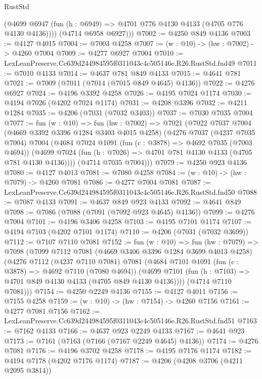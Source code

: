 \begin{lexlean}{RustStd}
\begin{coremodule}
          (@4699 @6947 (fun (h : @6949) => @4701 @776 @4130 @4133 (@4705 @776 @4130 @4136))))
        (@4714 @6958 @6927)))
@7002 := @4250 @849 @4136
@7003 := @4127 @4015
@7004 := @7003 @4258
@7007 := (w : @10) -> (hw : @7002) -> @4260 @7004
@7009 := @4277 @6927 @7004
@7010 := LexLeanPreserve.Cc639d244984595f0311043c4c505146e.R26.RustStd.fnd49
@7011 := @7010 @4133
@7014 := @4637 @781 @849 @4133
@7015 := @4641 @781
@7021 := @7009 (@7011 (@7014 (@7015 @849 @4645) @4136))
@7022 := @4276 @6927
@7024 := @4196 @3392 @4258
@7026 := @4195 @7024 @1174
@7030 := @4194 @7026 (@4202 @7024 @1174)
@7031 := @4208 @3396
@7032 := @4211 @1284
@7035 := @4206 (@7031 (@7032 @3403))
@7037 := @7030 @7035 @7004
@7077 := fun (w : @10) =>
  fun (hw : @7002) =>
  @7021
    (@7022
      @7037
      @7004
      (@4669 @3392 @3396 @1284 @3403 @4015 @4258)
      (@4276
        @7037
        (@4237 @7035 @7004)
        @7004
        (@4684
          @7024
          @1091
          (fun (c : @3878) => @4692 @7035 (@7003 @4694))
          (@4699 @7024 (fun (h : @7026) => @4701 @781 @4130 @4133 (@4705 @781 @4130 @4136))))
        (@4714 @7035 @7004)))
@7079 := @4250 @923 @4136
@7080 := @4127 @4013
@7081 := @7080 @4258
@7084 := (w : @10) -> (hw : @7079) -> @4260 @7081
@7086 := @4277 @7004 @7081
@7087 := LexLeanPreserve.Cc639d244984595f0311043c4c505146e.R26.RustStd.fnd50
@7088 := @7087 @4133
@7091 := @4637 @849 @923 @4133
@7092 := @4641 @849
@7098 := @7086 (@7088 (@7091 (@7092 @923 @4645) @4136))
@7099 := @4276 @7004
@7101 := @4196 @3406 @4258
@7103 := @4195 @7101 @1174
@7107 := @4194 @7103 (@4202 @7101 @1174)
@7110 := @4206 (@7031 (@7032 @3699))
@7112 := @7107 @7110 @7081
@7152 := fun (w : @10) =>
  fun (hw : @7079) =>
  @7098
    (@7099
      @7112
      @7081
      (@4669 @3406 @3396 @1284 @3699 @4013 @4258)
      (@4276
        @7112
        (@4237 @7110 @7081)
        @7081
        (@4684
          @7101
          @1091
          (fun (c : @3878) => @4692 @7110 (@7080 @4694))
          (@4699 @7101 (fun (h : @7103) => @4701 @849 @4130 @4133 (@4705 @849 @4130 @4136))))
        (@4714 @7110 @7081)))
@7154 := @4250 @2249 @4136
@7155 := @4127 @4011
@7156 := @7155 @4258
@7159 := (w : @10) -> (hw : @7154) -> @4260 @7156
@7161 := @4277 @7081 @7156
@7162 := LexLeanPreserve.Cc639d244984595f0311043c4c505146e.R26.RustStd.fnd51
@7163 := @7162 @4133
@7166 := @4637 @923 @2249 @4133
@7167 := @4641 @923
@7173 := @7161 (@7163 (@7166 (@7167 @2249 @4645) @4136))
@7174 := @4276 @7081
@7176 := @4196 @3702 @4258
@7178 := @4195 @7176 @1174
@7182 := @4194 @7178 (@4202 @7176 @1174)
@7187 := @4206 (@4208 @3706 (@4211 @2095 @3814))

\end{coremodule}
\end{lexlean}
